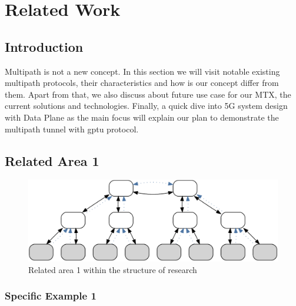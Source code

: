 \cleardoublepage\chapter{Related Work}\label{sec:related_work}\minitoc\vspace{.5cm}

\section{Introduction}



Multipath is not a new concept. In this section we will visit notable existing multipath protocols, their characteristics and how is our concept differ from them.
Apart from that, we also discuss about future use case for our \ac{MTX}, the current solutions and 
technologies. 
Finally, a quick dive into 5G system design with Data Plane as the main focus will explain our plan to demonstrate the multipath tunnel with \ac{gptu} protocol.

\section{Related Area 1}

\begin{figure}[H]
    \centering
    \includegraphics[width=.55\textwidth]{resources/images/example3}
    \caption{Related area 1 within the structure of research}\label{fig:hourglass:ra1}
\end{figure}



\subsection{Specific Example 1}

